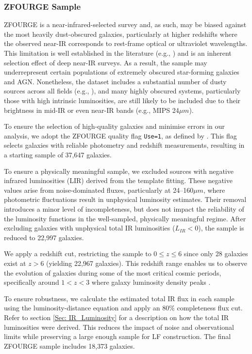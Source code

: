 \subsubsection{ZFOURGE Sample} \label{Sec: Galaxy LF Selection}
ZFOURGE is a near-infrared-selected survey and, as such, may be biased against the most heavily dust-obscured galaxies, particularly at higher redshifts where the observed near-IR corresponds to rest-frame optical or ultraviolet wavelengths. This limitation is well established in the literature (e.g., \citealp{fu_decomposing_2010, grazian_galaxy_2015}) and is an inherent selection effect of deep near-IR surveys. As a result, the sample may underrepresent certain populations of extremely obscured star-forming galaxies and AGN. Nonetheless, the dataset includes a substantial number of dusty sources across all fields (e.g., \citealp{spitler_exploring_2014}), and many highly obscured systems, particularly those with high intrinsic luminosities, are still likely to be included due to their brightness in mid-IR or even near-IR bands (e.g., MIPS 24$\mu m$). 

To ensure the selection of high-quality galaxies and minimise errors in our analysis, we adopt the ZFOURGE quality flag \texttt{Use=1}, as defined by \cite{straatman_fourstar_2016}. This flag selects galaxies with reliable photometry and redshift measurements, resulting in a starting sample of 37,647 galaxies.

To ensure a physically meaningful sample, we excluded sources with negative infrared luminosities (LIR) derived from the \cite{wuyts_fireworks_2008} template fitting. These negative values arise from noise-dominated fluxes, particularly at 24–160$\mu m$, where photometric fluctuations result in unphysical luminosity estimates. Their removal introduces a minor level of incompleteness, but does not impact the reliability of the luminosity functions in the well-sampled, physically meaningful regime. After excluding galaxies with unphysical total IR luminosities ($L_{IR} < 0$), the sample is reduced to 22,997 galaxies. 

We apply a redshift cut, restricting the sample to $0 \leq z \leq 6$ since only 28 galaxies exist at $z > 6$ (yielding  22,967 galaxies). This redshift range enables us to observe the evolution of galaxies during some of the most critical cosmic periods, specifically around $1 < z < 3$ \citep{gruppioni_modelling_2011, wylezalek_galaxy_2014} where galaxy luminosity density peaks \citep{assef_mid-ir-_2011}.

To ensure robustness, we calculate the estimated total IR flux in each sample using the luminosity-distance equation and apply an 80\% completeness flux cut. Refer to section \ref{Sec: IR_Luminosity} for a description on how the total IR luminosities were derived. This reduces the impact of noise and observational limits while preserving a large enough sample for LF construction. The final ZFOURGE sample includes 18,373 galaxies.

